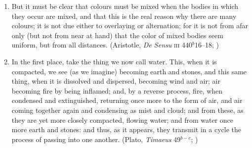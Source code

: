 \documentclass[10pt]{article}
\begin{document}
\begin{enumerate}
    \item But it must be clear that colours must be mixed when the bodies in which they occur are mixed, and that this is the real reason why there are many colours; it is not due either to overlaying or alternation; for it is not from afar only (but not from near at hand) that the color of mixed bodies seem uniform, but from all distances. (Aristotle, \emph{De Sensu} \textsc{iii} 440\( ^{b} \)16--18; \citealt[237]{Hett:1936fk})
    \item In the first place, take the thing we now call water. This, when it is compacted, we see (as we imagine) becoming earth and stones, and this same thing, when it is dissolved and dispersed, becoming wind and air; air becoming fire by being inflamed; and, by a reverse process, fire, when condensed and extinguished, returning once more to the form of air, and air coming together again and condensing as mist and cloud; and from these, as they are yet more closely compacted, flowing water; and from water once more earth and stones: and thus, as it appears, they transmit in a cycle the process of passing into one another. (Plato, \emph{Timaeus} 49\( ^{b-c} \); \citealt[179]{Cornford:1935fk})
\end{enumerate}

 

\end{document}
